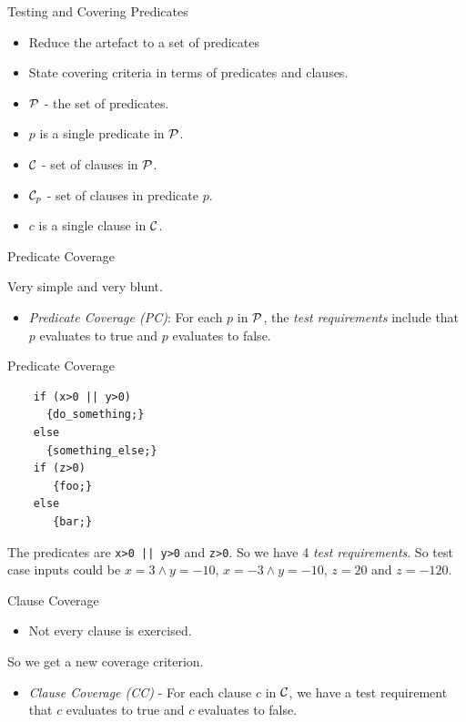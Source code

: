 \documentclass{beamer}
\newcommand{\predset}{{\cal P}}
\newcommand{\clauseset}{{\cal C}}
\begin{document}
\begin{frame}{Testing and Covering Predicates}
  \begin{itemize}
  \item Reduce the artefact to a set of predicates
  \item State covering criteria in terms of predicates and clauses.  
  \end{itemize}
  \begin{itemize}
  \item $\predset$ - the set of predicates.
  \item $p$ is a single predicate in $\predset$.
  \item $\clauseset$ - set of clauses in $\predset$.
  \item $\clauseset_p$ - set of clauses in predicate $p$.
   \item $c$ is a single clause in $\clauseset$.
  \end{itemize}
\end{frame}
\begin{frame}{Predicate Coverage}

Very simple and very blunt.
  \begin{itemize}
  \item {\em Predicate Coverage (PC)}: For each $p$ in $\predset$, the {\it test requirements}
   include that $p$ evaluates to true and $p$ evaluates to false. 
  \end{itemize}

\end{frame}
\begin{frame}[fragile]{Predicate Coverage}

  \begin{lstlisting}
    if (x>0 || y>0) 
      {do_something;} 
    else
      {something_else;}
    if (z>0) 
       {foo;}
    else
       {bar;}
  \end{lstlisting}
The predicates are \verb+x>0 || y>0+ and \verb+z>0+. So we have 4 {\it test
requirements}. So test case inputs could be $x=3\land y=-10$,
$x=-3\land y=-10$, $z=20$ and $z=-120$.
\end{frame}
\begin{frame}{Clause Coverage}
  \begin{itemize}
  \item Not every clause is exercised. 
  \end{itemize}
So we get a new coverage criterion.
\begin{itemize}
\item {\em Clause Coverage (CC)} - For each clause $c$ in
  $\clauseset$, we have a test requirement that $c$ evaluates to true
  and $c$ evaluates to false.
\end{itemize}
\end{frame}
\end{document}

